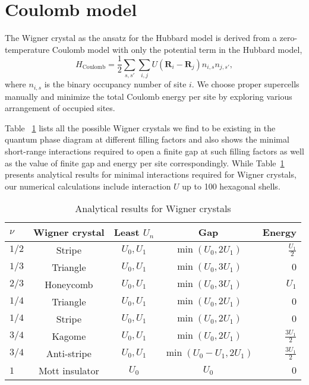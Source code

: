 \documentclass[aps,prl,floatfix,twocolumn]{revtex4-1}
\begin{document}
\section{Coulomb model}
The Wigner crystal as the ansatz for the Hubbard model is derived from a zero-temperature Coulomb model with only the potential term in the Hubbard model,
\begin{equation}
	H_{\text{Coulomb}}=\frac{1}{2}\sum_{s,s'}\sum_{i,j}U(\bm{R}_i-\bm{R}_j) n_{i,s}n_{j,s'},
\end{equation}
where $ n_{i,s}$ is the binary occupancy number of site $ i $. We choose proper supercells manually and minimize the total Coulomb energy per site by exploring various arrangement of occupied sites. 

Table ~\ref{tab:wc} lists all the possible Wigner crystals we find to be existing in the quantum phase diagram at different filling factors and also shows the minimal short-range interactions required to open a finite gap at such filling factors as well as the value of finite gap and energy per site correspondingly. While Table~\ref{tab:wc} presents analytical results for minimal interactions required for Wigner crystals,  our numerical calculations include interaction $U$ up to 100 hexagonal shells. 

\begin{table}[b]
	
	\caption{\label{tab:wc}Analytical results for Wigner crystals}
	\begin{ruledtabular}
		\begin{tabular}{lcccr}
			$ \nu $ & Wigner crystal & Least $ U_n $ & Gap & Energy\\
			\hline
			$ 1/2 $ & Stripe & $ U_0,U_1 $ &$ \min(U_0,2U_1) $ & $ \frac{U_1}{2} $\\
			$ 1/3 $ & Triangle & $ U_0,U_1 $& $ \min(U_0,3U_1) $ & $ 0 $\\
			$ 2/3 $ & Honeycomb & $ U_0,U_1 $ & $ \min(U_0,3U_1) $ & $ U_1 $\\
			$ 1/4 $ & Triangle & $ U_0,U_1 $ & $ \min(U_0,2U_1) $ & $ 0 $\\
			$ 1/4 $ & Stripe & $ U_0,U_1 $  & $ \min(U_0,2U_1) $ & $ 0 $\\
			$ 3/4 $ & Kagome  & $ U_0,U_1 $ & $ \min(U_0,2U_1) $ & $ \frac{3U_1}{2} $\\
			$ 3/4 $ & Anti-stripe & $ U_0,U_1 $ & $ \min(U_0-U_1,2U_1) $ & $ \frac{3U_1}{2} $ \\
			$ 1 $ & Mott insulator & $ U_0 $ & $ U_0 $ & $ 0 $
		\end{tabular}
	\end{ruledtabular}
\end{table}
\end{document}
